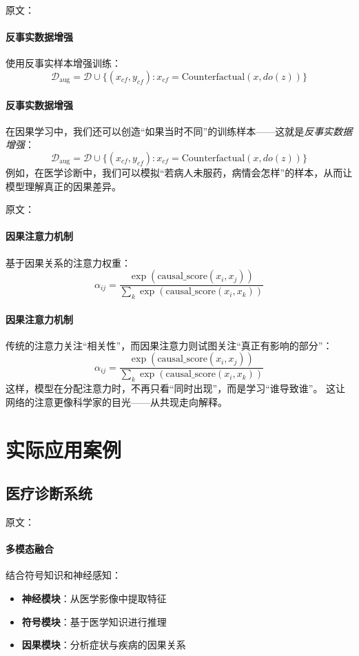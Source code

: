 原文：
\paragraph{反事实数据增强}
使用反事实样本增强训练：
$$\mathcal{D}_{\text{aug}} = \mathcal{D} \cup \{(x_{cf}, y_{cf}) : x_{cf} = \text{Counterfactual}(x, do(z))\}$$
\paragraph{反事实数据增强}
在因果学习中，我们还可以创造“如果当时不同”的训练样本——这就是\emph{反事实数据增强}：  
$$\mathcal{D}_{\text{aug}} = \mathcal{D} \cup \{(x_{cf}, y_{cf}) : x_{cf} = \text{Counterfactual}(x, do(z))\}$$
例如，在医学诊断中，我们可以模拟“若病人未服药，病情会怎样”的样本，从而让模型理解真正的因果差异。

原文：
\paragraph{因果注意力机制}
基于因果关系的注意力权重：
$$\alpha_{ij} = \frac{\exp(\text{causal\_score}(x_i, x_j))}{\sum_{k} \exp(\text{causal\_score}(x_i, x_k))}$$
\paragraph{因果注意力机制}
传统的注意力关注“相关性”，而因果注意力则试图关注“真正有影响的部分”：  
$$\alpha_{ij} = \frac{\exp(\text{causal\_score}(x_i, x_j))}{\sum_{k} \exp(\text{causal\_score}(x_i, x_k))}$$
这样，模型在分配注意力时，不再只看“同时出现”，而是学习“谁导致谁”。  
这让网络的注意更像科学家的目光——从共现走向解释。



\section{实际应用案例}

\subsection{医疗诊断系统}

原文：
\paragraph{多模态融合}
结合符号知识和神经感知：
\begin{itemize}
\item \textbf{神经模块}：从医学影像中提取特征
\item \textbf{符号模块}：基于医学知识进行推理
\item \textbf{因果模块}：分析症状与疾病的因果关系
\end{itemize}
